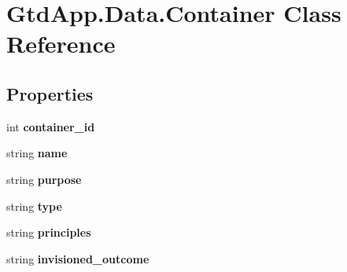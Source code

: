 \hypertarget{class_gtd_app_1_1_data_1_1_container}{}\section{Gtd\+App.\+Data.\+Container Class Reference}
\label{class_gtd_app_1_1_data_1_1_container}
\subsection*{Properties}
\begin{DoxyCompactItemize}
\item 
\mbox{\label{class_gtd_app_1_1_data_1_1_container_a4cb0c959b54c02d9710d3c41746d0197}} 
int {\bfseries container\+\_\+id}
\item 
\mbox{\label{class_gtd_app_1_1_data_1_1_container_aaa1f25d81d743cea16163c41c980bc44}} 
string {\bfseries name}
\item 
\mbox{\label{class_gtd_app_1_1_data_1_1_container_a01a62a92a5c68157125755a34a508884}} 
string {\bfseries purpose}
\item 
\mbox{\label{class_gtd_app_1_1_data_1_1_container_ae645b9756bc6f7dbeb899aa9f0dfd10e}} 
string {\bfseries type}
\item 
\mbox{\label{class_gtd_app_1_1_data_1_1_container_ae0091f147c3c9c00150ffbe36fff8ee9}} 
string {\bfseries principles}
\item 
\mbox{\label{class_gtd_app_1_1_data_1_1_container_a9694c2ca9af108232ba0aa67f996f4ce}} 
string {\bfseries invisioned\+\_\+outcome}

\end{DoxyCompactItemize}
